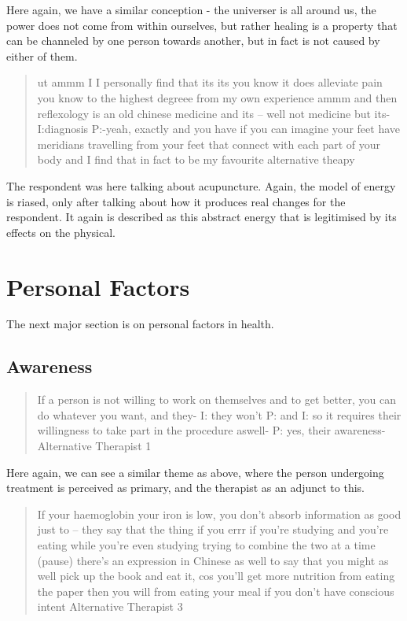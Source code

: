 Here again, we have a similar conception - the universer is all around us, the power does not come from within ourselves, but rather healing is a property that can be channeled by one person towards another, but in fact is not caused by either of them. 

\begin{quotation}
  ut ammm I I personally find that its its you know it does alleviate pain you know to the highest degreee from my own experience ammm and then reflexology is an old chinese medicine and its – well not medicine but its-
I:diagnosis
P:-yeah, exactly and you have if you can imagine your feet have meridians travelling from your feet that connect with each part of your body and I find that in fact to be my favourite alternative theapy

\end{quotation}

The respondent was here talking about acupuncture. Again, the model of energy is riased, only after talking about how it produces real changes for the respondent. It again is described as this abstract energy that is legitimised by its effects on the physical. 

\section{Personal Factors}
\label{sec:personal-factors}

The next major section is on personal factors in health.

\subsection{Awareness}
\label{sec:awareness}

\begin{quotation}
  If a person is not willing to work on themselves and to get better, you can do whatever you want, and they-
I: they won't
P: and 
I: so it requires their willingness to take part in the procedure aswell-
P: yes, their awareness-
Alternative Therapist 1
\end{quotation}


Here again, we can see a similar theme as above, where the person undergoing treatment is perceived as primary, and the therapist as an adjunct to this. 


\begin{quotation}
   If your haemoglobin your iron is low, you don't absorb information as good just to – they say that the thing if you errr if you're studying and you're eating while you're even studying trying to combine the two at a time (pause) there's an expression in Chinese as well to say that you might as well pick up the book and eat it, cos you'll get more nutrition from eating the paper then you will from eating your meal if you don't have conscious intent 
Alternative Therapist 3
\end{quotation}


